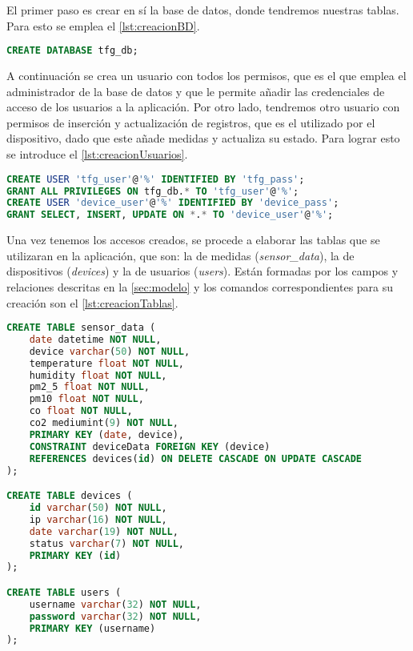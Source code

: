 El primer paso es crear en sí la base de datos, donde tendremos nuestras tablas. Para esto se emplea el \autoref{lst:creacionBD}.
\begin{lstlisting}[language=SQL, caption=Creación de la base de datos,label=lst:creacionBD]
CREATE DATABASE tfg_db;
\end{lstlisting}

A continuación se crea un usuario con todos los permisos, que es el que emplea el administrador de la base de datos y que le permite añadir las credenciales de acceso de los usuarios a la aplicación. Por otro lado, tendremos otro usuario con permisos de inserción y actualización de registros, que es el utilizado por el dispositivo, dado que este añade medidas y actualiza su estado. Para lograr esto se introduce el \autoref{lst:creacionUsuarios}.
\begin{lstlisting}[language=SQL, caption=Creación de usuarios de la base de datos, label=lst:creacionUsuarios]
CREATE USER 'tfg_user'@'%' IDENTIFIED BY 'tfg_pass';
GRANT ALL PRIVILEGES ON tfg_db.* TO 'tfg_user'@'%';
CREATE USER 'device_user'@'%' IDENTIFIED BY 'device_pass';
GRANT SELECT, INSERT, UPDATE ON *.* TO 'device_user'@'%';
\end{lstlisting}

Una vez tenemos los accesos creados, se procede a elaborar las tablas que se utilizaran en la aplicación, que son: la de medidas (\textit{sensor\_data}), la de dispositivos (\textit{devices}) y la de usuarios (\textit{users}). Están formadas por los campos y relaciones descritas en la \autoref{sec:modelo} y los comandos correspondientes para su creación son el \autoref{lst:creacionTablas}.
\begin{lstlisting}[language=SQL, caption=Creación de tablas de la base de datos, label=lst:creacionTablas]
CREATE TABLE sensor_data (
    date datetime NOT NULL,
    device varchar(50) NOT NULL,
    temperature float NOT NULL,
    humidity float NOT NULL,
    pm2_5 float NOT NULL,
    pm10 float NOT NULL,
    co float NOT NULL,
    co2 mediumint(9) NOT NULL,
    PRIMARY KEY (date, device),
    CONSTRAINT deviceData FOREIGN KEY (device) 
    REFERENCES devices(id) ON DELETE CASCADE ON UPDATE CASCADE
);

CREATE TABLE devices (
    id varchar(50) NOT NULL,
    ip varchar(16) NOT NULL,
    date varchar(19) NOT NULL,
    status varchar(7) NOT NULL,
    PRIMARY KEY (id)
);

CREATE TABLE users (
    username varchar(32) NOT NULL,
    password varchar(32) NOT NULL,
    PRIMARY KEY (username)
);
\end{lstlisting}


